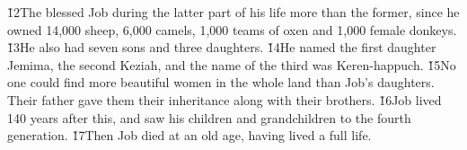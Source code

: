 \v{12}The  blessed Job during the latter part of his life more than the former, since he owned 14,000 sheep, 6,000 camels, 1,000 teams of oxen and 1,000 female donkeys. \v{13}He also had seven sons and three daughters. \v{14}He named the first daughter Jemima, the second Keziah, and the name of the third was Keren-happuch. \v{15}No one could find more beautiful women in the whole land than Job's daughters. Their father gave them their inheritance along with their brothers. \v{16}Job lived 140 years after this, and saw his children and grandchildren to the fourth generation. \v{17}Then Job died at an old age, having lived a full life.

